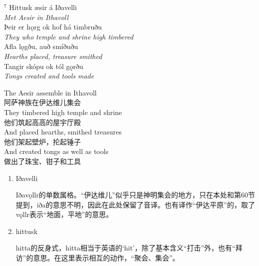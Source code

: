 \begin{paracol}{2}
    \noindent
    $^7 $ Hittusk æsir á Iðavelli\\
    \textit{Met Aesir in Ithavoll}\\
    Þeir er hǫrg ok hof há timbruðu\\
    \textit{They who temple and shrine high timbered}\\
    Afla lǫgðu, auð smíðuðu\\
    \textit{Hearths placed, treasure smithed}\\
    Tangir skópu ok tól gǫrðu\\
    \textit{Tongs created and tools made}\\

    \switchcolumn

    \noindent
    The Aesir assemble in Ithavoll\\
    阿萨神族在伊达维儿集会\\
    They timbered high temple and shrine\\
    他们筑起高高的屋宇厅殿\\
    And placed hearths, smithed treasures\\
    他们架起壁炉，抡起锤子\\
    And created tongs as well as tools\\
    做出了珠宝、钳子和工具\\
\end{paracol}

\begin{grammar*}{}
    \begin{enumerate}[leftmargin=*]
        \item Iðavelli

              Iðav\k{o}llr的单数属格。“伊达维儿”似乎只是神明集会的地方，只在本处和第60节提到，iða的意思不明，因此在此处保留了音译。也有译作“伊达平原”的，取了v\k{o}llr表示“地面，平地”的意思。

        \item hittusk

              hitta的反身式，hitta相当于英语的`hit'，除了基本含义“打击”外，也有“拜访”的意思。在这里表示相互的动作，“聚会、集会”。
    \end{enumerate}
\end{grammar*}
\hspace*{\fill}\\ %

